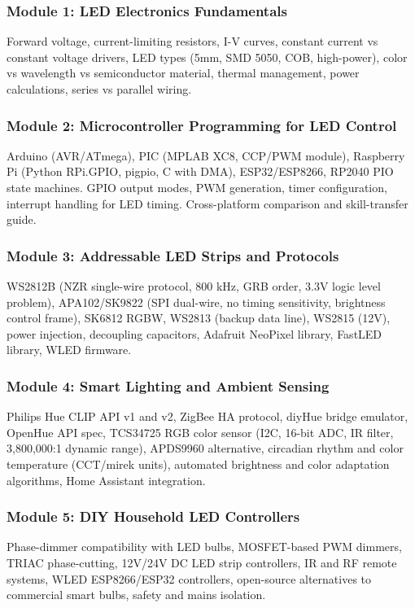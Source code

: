 \documentclass[11pt,letterpaper]{article}
\begin{document}
\subsubsection{Module 1: LED Electronics Fundamentals}
Forward voltage, current-limiting resistors, I-V curves, constant current vs constant voltage drivers, LED types (5mm, SMD 5050, COB, high-power), color vs wavelength vs semiconductor material, thermal management, power calculations, series vs parallel wiring.

\subsubsection{Module 2: Microcontroller Programming for LED Control}
Arduino (AVR/ATmega), PIC (MPLAB XC8, CCP/PWM module), Raspberry Pi (Python RPi.GPIO, pigpio, C with DMA), ESP32/ESP8266, RP2040 PIO state machines. GPIO output modes, PWM generation, timer configuration, interrupt handling for LED timing. Cross-platform comparison and skill-transfer guide.

\subsubsection{Module 3: Addressable LED Strips and Protocols}
WS2812B (NZR single-wire protocol, 800 kHz, GRB order, 3.3V logic level problem), APA102/SK9822 (SPI dual-wire, no timing sensitivity, brightness control frame), SK6812 RGBW, WS2813 (backup data line), WS2815 (12V), power injection, decoupling capacitors, Adafruit NeoPixel library, FastLED library, WLED firmware.

\subsubsection{Module 4: Smart Lighting and Ambient Sensing}
Philips Hue CLIP API v1 and v2, ZigBee HA protocol, diyHue bridge emulator, OpenHue API spec, TCS34725 RGB color sensor (I2C, 16-bit ADC, IR filter, 3,800,000:1 dynamic range), APDS9960 alternative, circadian rhythm and color temperature (CCT/mirek units), automated brightness and color adaptation algorithms, Home Assistant integration.

\subsubsection{Module 5: DIY Household LED Controllers}
Phase-dimmer compatibility with LED bulbs, MOSFET-based PWM dimmers, TRIAC phase-cutting, 12V/24V DC LED strip controllers, IR and RF remote systems, WLED ESP8266/ESP32 controllers, open-source alternatives to commercial smart bulbs, safety and mains isolation.
\end{document}
